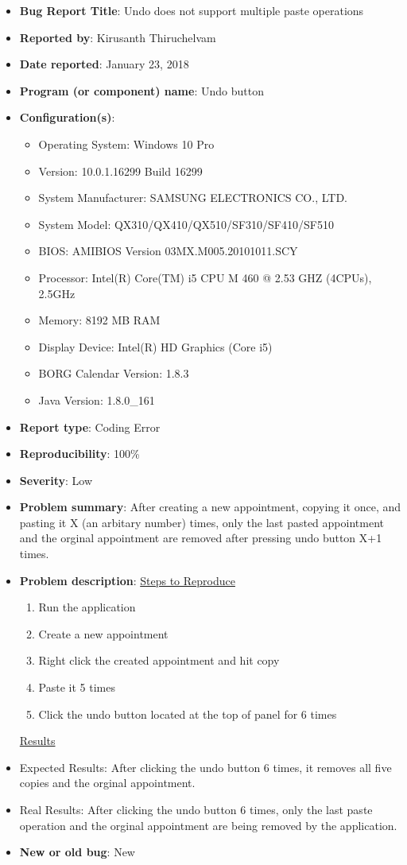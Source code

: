 \documentclass[fontsize=12pt,paper=letter,twoside]{scrartcl}
\begin{document}
\begin{itemize}
\item \textbf{Bug Report Title}: Undo does not support multiple paste operations
\item \textbf{Reported by}: Kirusanth Thiruchelvam
\item \textbf{Date reported}: January 23, 2018
\item \textbf{Program (or component) name}: Undo button
\item \textbf{Configuration(s)}:
\begin{itemize}
\item Operating System: Windows 10 Pro 
\item Version: 10.0.1.16299 Build 16299
\item System Manufacturer: SAMSUNG ELECTRONICS CO., LTD.
\item System Model: QX310/QX410/QX510/SF310/SF410/SF510
\item BIOS: AMIBIOS Version 03MX.M005.20101011.SCY 
\item Processor: Intel(R) Core(TM) i5 CPU   M 460   @ 2.53 GHZ (4CPUs), ~ 2.5GHz
\item Memory: 8192 MB RAM
\item Display Device: Intel(R) HD Graphics (Core i5)
\item BORG Calendar Version: 1.8.3
\item Java Version: 1.8.0\_161
\end{itemize}
\item \textbf{Report type}: Coding Error
\item \textbf{Reproducibility}: 100\%
\item \textbf{Severity}: Low
\item \textbf{Problem summary}: After creating a new appointment, copying it once, and pasting it X (an arbitary number) times, only the last pasted appointment and the orginal appointment are removed after pressing undo button X+1 times. 
\item \textbf{Problem description}:\newline
\underline{Steps to Reproduce}
\begin{enumerate}
\item Run the application
 \item Create a new appointment
 \item Right click the created appointment and hit copy 
 \item Paste it 5 times
 \item Click the undo button located at the top of panel for 6 times
\end {enumerate}
 \underline{ Results}

\item Expected Results: After clicking the undo button 6 times, it  removes all five copies and the orginal appointment.
\item Real Results: After clicking the undo button 6 times, only the last paste operation and the orginal appointment are being removed by the application.
\item \textbf{New or old bug}: New
\end{itemize}
\end{document}
